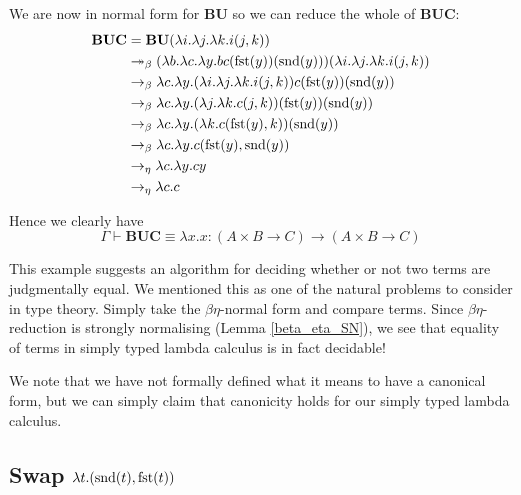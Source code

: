 \begin{example}
    We are now in normal form for $\mathbf{B} \mathbf{U}$ so we can reduce the whole of $\mathbf{B} \mathbf{U} \mathbf{C}$:
    \begin{equation*}
        \begin{aligned}
            \mathbf{B} \mathbf{U} \mathbf{C} &= \mathbf{B} \mathbf{U} (\lambda i . \lambda j . \lambda k . i (j , k)) \\
            &\twoheadrightarrow_{\beta} (\lambda b . \lambda c . \lambda y. b c(\mathrm{fst}(y))(\mathrm{snd}(y))) (\lambda i . \lambda j . \lambda k . i (j , k)) \\
            &\to_{\beta} \lambda c . \lambda y.  (\lambda i . \lambda j . \lambda k . i (j , k)) c(\mathrm{fst}(y))(\mathrm{snd}(y)) \\
            &\to_{\beta} \lambda c . \lambda y.  (\lambda j . \lambda k . c (j , k)) (\mathrm{fst}(y))(\mathrm{snd}(y)) \\
            &\to_{\beta} \lambda c . \lambda y.  (\lambda k . c (\mathrm{fst}(y) , k)) (\mathrm{snd}(y)) \\
            &\to_{\beta} \lambda c . \lambda y.  c (\mathrm{fst}(y) , \mathrm{snd}(y))  \\
            &\to_{\eta} \lambda c . \lambda y . c y \\
            &\to_{\eta} \lambda c . c
        \end{aligned}
    \end{equation*}
    
    Hence we clearly have
    $$
        \Gamma \vdash \mathbf{B} \mathbf{U} \mathbf{C} \equiv \lambda x . x : (A \times B \to C) \to (A \times B \to C)
    $$
\end{example}

\begin{remark}
    This example suggests an algorithm for deciding whether or not two terms are judgmentally equal. 
    We mentioned this as one of the natural problems to consider in type theory.
    Simply take the $\beta \eta$-normal form and compare terms. Since $\beta \eta$-reduction is strongly normalising (Lemma \ref{beta_eta_SN}), we see that equality of terms in simply typed lambda calculus is in fact decidable!
\end{remark}

\begin{remark}
     We note that we have not formally defined what it means to have a canonical form, but we can simply claim that canonicity holds for our simply typed lambda calculus.
\end{remark}

\subsection{Swap \texorpdfstring{$\lambda t . (\mathrm{snd}(t), \mathrm{fst}(t))$}{}}

